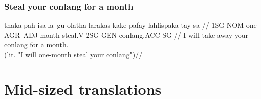 \subsection{Steal your conlang for a month}
\ex
\begingl
    \gla  thaka-pah isa la~gu-olatha  larakas kake-pafay lahfispaka-tay-sa //
    \glb  1SG-NOM   one AGR~ADJ-month steal.V 2SG-GEN    conlang.ACC-SG //
    \glft I will take away your conlang for a month.\\
          (lit. "I will one-month steal your conlang")//
\endgl
\xe




\chapter{Mid-sized translations}

\newpage

\newpage


\newpage
